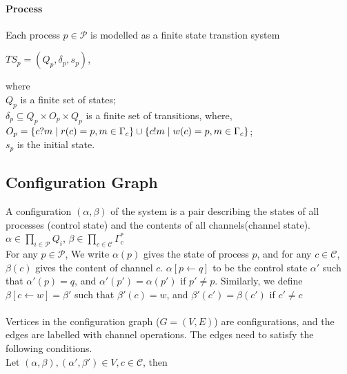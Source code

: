 \documentclass[a4paper,UKenglish,cleveref, autoref, thm-restate]{lipics-v2019}
\begin{document}
\paragraph*{Process}

Each process $p\in \mathcal{P}$ is modelled as a finite state transtion system 
\begin{center}
   $TS_p = (Q_p, \delta_p, s_p)$,
\end{center}
where \\
\hspace*{1cm} $Q_p$ is a finite set of states;\\
\hspace*{1cm} $\delta_p \subseteq Q_p \times O_p \times Q_p$ is a finite set of transitions, where, \\
\hspace*{2cm} $O_p = \{ c?m \hspace{1mm}| \hspace{1mm} r(c) = p,  m \in \Gamma_c\} \cup \{ c!m \hspace{1mm}| \hspace{1mm} w(c) = p, m \in \Gamma_c\}$; \\
\hspace*{1cm} $s_p$ is the initial state.



\subsection{Configuration Graph}

A configuration $(\alpha, \beta)$ of the system is a pair describing the states of all processes (control state) and the contents of all channels(channel state). \\
\hspace*{5cm} ${\displaystyle \alpha \in \prod_{i \in \mathcal{P}} Q_i}$, ${\displaystyle \beta \in \prod_{c \in \mathcal{C}} \Gamma_c^*}$\\
For any $p \in \mathcal{P}$, We write $\alpha(p)$ gives the state of process $p$, and for any $c \in \mathcal{C}$, $\beta(c)$ gives the content of channel $c$. $\alpha[p \leftarrow q]$ to be the control state  $\alpha'$ such that $\alpha'(p) = q$, and $\alpha'(p') = \alpha(p')$ if $p' \neq p$. Similarly, we define $\beta[c \leftarrow w]= \beta'$ such that $\beta'(c) = w$, and $\beta'(c') = \beta(c')$ if $c' \neq c$
\\
\\
Vertices in the configuration graph ($G = (V, E)$) are configurations, and the edges are labelled with channel operations. The edges need to satisfy the following conditions. \\
Let $(\alpha, \beta), (\alpha', \beta') \in V, c \in \mathcal{C}$, then 
\end{document}
